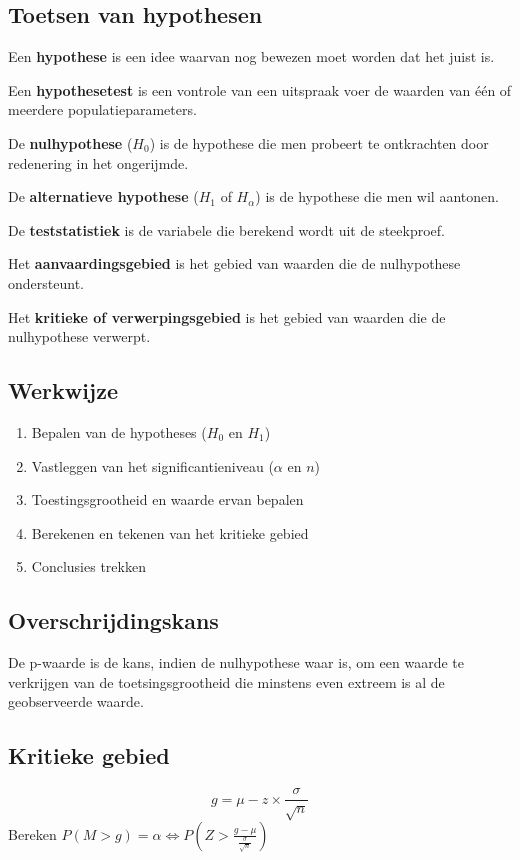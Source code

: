 \documentclass[a4paper,12pt]{article}
\begin{document}
\subsection{Toetsen van hypothesen}
Een \textbf{hypothese} is een idee waarvan nog bewezen moet worden dat het juist is.

Een \textbf{hypothesetest} is een vontrole van een uitspraak voer de waarden van één of meerdere populatieparameters.

De \textbf{nulhypothese} ($H_0$) is de hypothese die men probeert te ontkrachten door redenering in het ongerijmde.

De \textbf{alternatieve hypothese} ($H_1$ of $H_\alpha$) is de hypothese die men wil aantonen.

De \textbf{teststatistiek} is de variabele die berekend wordt uit de steekproef.

Het \textbf{aanvaardingsgebied} is het gebied van waarden die de nulhypothese ondersteunt.

Het \textbf{kritieke of verwerpingsgebied} is het gebied van waarden die de nulhypothese verwerpt.

\subsection{Werkwijze}
\begin{enumerate}
\item Bepalen van de hypotheses ($H_0$ en $H_1$)
\item Vastleggen van het significantieniveau ($\alpha$ en $n$)
\item Toestingsgrootheid en waarde ervan bepalen
\item Berekenen en tekenen van het kritieke gebied
\item Conclusies trekken
\end{enumerate}

\subsection{Overschrijdingskans}
De p-waarde is de kans, indien de nulhypothese waar is, om een waarde te verkrijgen van de toetsingsgrootheid die minstens even extreem is al de geobserveerde waarde.

\subsection{Kritieke gebied}
\begin{equation}
g=\mu-z\times \frac{\sigma}{\sqrt{n}}
\end{equation}
Bereken $P(M>g)=\alpha \Leftrightarrow P(Z>\frac{g-\mu}{\frac{\sigma}{\sqrt{n}}})$
\end{document}
